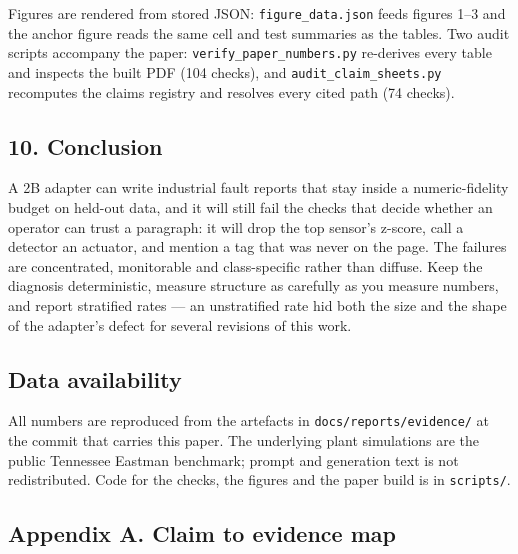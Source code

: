 \documentclass[
  10pt,
]{article}
\begin{document}
Figures are rendered from stored JSON: \texttt{figure\_data.json} feeds
figures 1--3 and the anchor figure reads the same cell and test
summaries as the tables. Two audit scripts accompany the paper:
\texttt{verify\_paper\_numbers.py} re-derives every table and inspects
the built PDF (104 checks), and \texttt{audit\_claim\_sheets.py}
recomputes the claims registry and resolves every cited path (74
checks).

\subsection{10. Conclusion}\label{conclusion}

A 2B adapter can write industrial fault reports that stay inside a
numeric-fidelity budget on held-out data, and it will still fail the
checks that decide whether an operator can trust a paragraph: it will
drop the top sensor's z-score, call a detector an actuator, and mention
a tag that was never on the page. The failures are concentrated,
monitorable and class-specific rather than diffuse. Keep the diagnosis
deterministic, measure structure as carefully as you measure numbers,
and report stratified rates --- an unstratified rate hid both the size
and the shape of the adapter's defect for several revisions of this
work.

\subsection{Data availability}\label{data-availability}

All numbers are reproduced from the artefacts in
\texttt{docs/\allowbreak{}reports/\allowbreak{}evidence/\allowbreak{}} at the commit that carries this paper.
The underlying plant simulations are the public Tennessee Eastman
benchmark; prompt and generation text is not redistributed. Code for the
checks, the figures and the paper build is in \texttt{scripts/\allowbreak{}}.

\subsection{Appendix A. Claim to evidence
map}\label{appendix-a.-claim-to-evidence-map}
\end{document}
